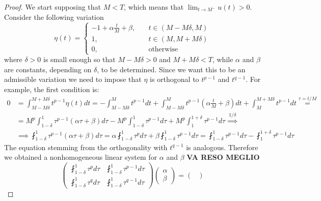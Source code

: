 \documentclass[corpo=11pt, stile=classica, tipotesi=custom,
greek, evenboxes, english]{toptesi}
\numberwithin{equation}{chapter}
\begin{document}
\begin{proof}
We start supposing that $M < T$, which means that $\lim_{t \rightarrow M^-} u(t) > 0$. Consider the following variation 
\begin{equation*}
	\eta(t) = \left\{
	\begin{aligned}
		-1 + \alpha \frac{t}{M} + \beta,\quad & t \in (M-M\delta,M)\\
		1,\quad					   & t \in (M,M+M\delta)\\
		0,\quad				   & \text{otherwise}
	\end{aligned}\right.
\end{equation*}
where $\delta>0$ is small enough so that $M-M\delta >0$ and $M+M\delta < T$, while $\alpha$ and $\beta$ are constants, depending on $\delta$, to be determined. Since we want this to be an admissible variation we need to impose that $\eta$ is orthogonal to $t^{p-1}$ and $t^{q-1}$. For example, the first condition is:
\begin{align*}
	0 &= \int_{M-M\delta}^{M+M\delta} t^{p-1} \eta(t) dt = -\int_{M-M\delta}^M t^{p-1}dt + \int_{M-M\delta}^M t^{p-1}\left(\alpha \frac{t}{M} + \beta\right) dt + \int_M^{M+M\delta} t^{p-1}dt \overset{\tau=t/M}{=}\\
	  &= M^p \int_{1-\delta}^1 \tau^{p-1}(\alpha \tau + \beta) d\tau - M^p \int_{1-\delta}^1 \tau^{p-1} d\tau + M^p \int_1^{1+\delta} \tau^{p-1} d\tau \overset{1/\delta}{\implies}\\
	  &\implies \fint_{1-\delta}^1 \tau^{p-1}(\alpha \tau + \beta) d\tau = \alpha \fint_{1-\delta}^1 \tau^{p} d\tau + \beta \fint_{1-\delta}^1 \tau^{p-1} d\tau = \fint_{1-\delta}^1 \tau^{p-1} d\tau - \fint_1^{1+\delta} \tau^{p-1} d\tau 
\end{align*}
The equation stemming from the orthogonality with $t^{q-1}$ is analogous. Therefore we obtained a nonhomogeneous linear system for $\alpha$ and $\beta$
\textbf{VA RESO MEGLIO}
\begin{equation}\label{system continuity}
	\begin{pmatrix}
		 \fint_{1-\delta}^1 \tau^{p} d\tau &   \fint_{1-\delta}^1 \tau^{p-1} d\tau\\
		 \fint_{1-\delta}^1 \tau^{q} d\tau &   \fint_{1-\delta}^1 \tau^{q-1} d\tau
	\end{pmatrix}
	\begin{pmatrix}
		\alpha\\
		\beta
	\end{pmatrix}=
	\begin{pmatrix}

\end{pmatrix}
\end{equation}
\end{proof}
\end{document}
